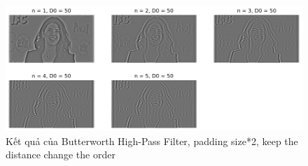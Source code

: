 \documentclass{article}
\begin{document}
        \begin{figure}[ht!]
        \centering
        \includegraphics[width = \linewidth]{fo23b.png}
        \caption{Kết quả của Butterworth High-Pass Filter, padding size*2, keep the distance change the order}
        \label{fig25}
        \end{figure}

        \newpage
        \phantom{a}
        \newpage
\end{document}
